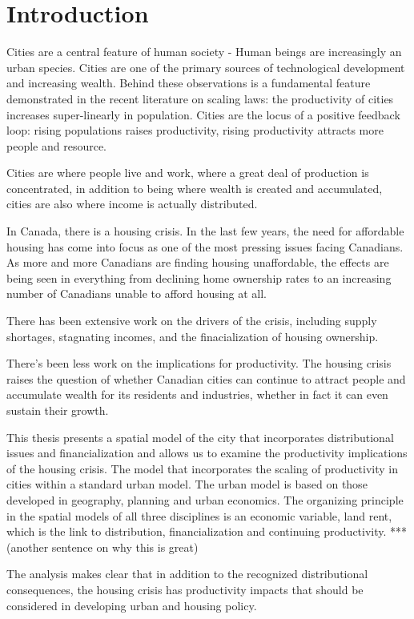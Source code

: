 \chapter{Introduction}

Cities are a central feature of human society - Human beings are increasingly an urban species. Cities are one of the primary sources of technological development and increasing wealth. Behind these observations is a fundamental feature demonstrated in the recent literature on scaling laws: the productivity of cities increases super-linearly in population. Cities are the locus of a positive feedback loop: rising populations raises productivity, rising productivity attracts more people and resource.

Cities are where people live and work, where a great deal of production is concentrated, in addition to being where wealth is created and accumulated, cities are also where income is actually distributed. 

In Canada, there is a housing crisis. In the last few years, the need for affordable housing has come into focus as one of the most pressing issues facing Canadians. As more and more Canadians are finding housing unaffordable, the effects are being seen in everything from declining home ownership rates to an increasing number of Canadians unable to afford housing at all.

There has been extensive work on the drivers of the crisis, including supply shortages, stagnating incomes, and the finacialization of housing ownership.

There's been less work on the implications for productivity. The housing crisis raises the question of whether Canadian cities can continue to attract people and accumulate wealth for its residents and industries, whether in fact it can even sustain their growth.

This thesis presents a spatial model of the city that incorporates distributional issues and financialization and allows us to examine the productivity implications of the housing crisis. The model that incorporates the scaling of productivity in cities within a standard urban model. 
The urban model is based on those developed in geography, planning and urban economics. The organizing principle in  the spatial models of all three disciplines is an economic variable, land rent, which is the link to distribution, financialization and continuing productivity. *** (another sentence on why this is great)

The analysis makes clear that in addition to the recognized distributional consequences, the housing crisis has productivity impacts that should be considered in developing urban and housing policy. 


